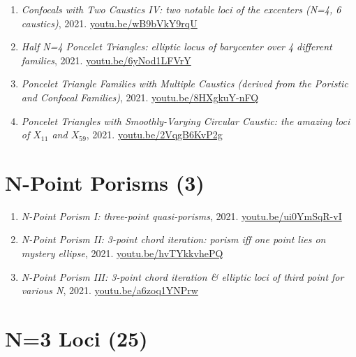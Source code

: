 \documentclass[12pt]{article}
\begin{document}
\begin{enumerate}[resume]
\item \textit{Confocals with Two Caustics IV: two notable loci of the excenters (N=4, 6 caustics)}, 2021. \href{https://youtu.be/wB9bVkY9rqU}{\url{youtu.be/wB9bVkY9rqU}}
\item \textit{Half N=4 Poncelet Triangles: elliptic locus of barycenter over 4 different families}, 2021. \href{https://youtu.be/6yNod1LFVrY}{\url{youtu.be/6yNod1LFVrY}}
\item \textit{Poncelet Triangle Families with Multiple Caustics (derived from the Poristic and Confocal Families)}, 2021. \href{https://youtu.be/8HXgkuY-nFQ}{\url{youtu.be/8HXgkuY-nFQ}}
\item \textit{Poncelet Triangles with Smoothly-Varying Circular Caustic: the amazing loci of $X_{11}$ and $X_{59}$}, 2021. \href{https://youtu.be/2VqgB6KvP2g}{\url{youtu.be/2VqgB6KvP2g}}
\end{enumerate}

\section{N-Point Porisms (3)}

\begin{enumerate}[resume]
\item \textit{N-Point Porism I: three-point quasi-porisms}, 2021. \href{https://youtu.be/ui0YmSqR-vI}{\url{youtu.be/ui0YmSqR-vI}}
\item \textit{N-Point Porism II: 3-point chord iteration: porism iff one point lies on mystery ellipse}, 2021. \href{https://youtu.be/hvTYkkvhePQ}{\url{youtu.be/hvTYkkvhePQ}}
\item \textit{N-Point Porism III: 3-point chord iteration \& elliptic loci of third point for various N}, 2021. \href{https://youtu.be/a6zoq1YNPrw}{\url{youtu.be/a6zoq1YNPrw}}
\end{enumerate}

\section{N=3 Loci (25)}
\end{document}

